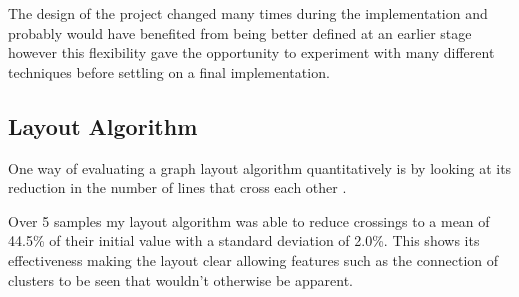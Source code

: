 \documentclass[12pt,a4paper]{article}
\begin{document}
The design of the project changed many times during the implementation and probably would have benefited from being better defined at an earlier stage however this flexibility gave the opportunity to experiment with many different techniques before settling on a final implementation. 

\subsection{Layout Algorithm}
\noindent
One way of evaluating a graph layout algorithm quantitatively is by looking at its reduction in the number of lines that cross each other \cite{himsolt1995comparing}.

Over 5 samples my layout algorithm was able to reduce crossings to a mean of 44.5\% of their initial value with a standard deviation of 2.0\%. This shows its effectiveness making the layout clear allowing features such as the connection of clusters to be seen that wouldn't otherwise be apparent.
\end{document}
